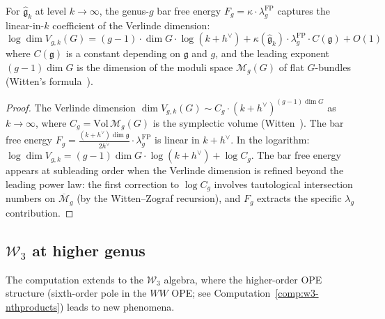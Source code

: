 \begin{proposition}
\label{prop:bar-verlinde-asymptotics}
For $\widehat{\mathfrak{g}}_k$ at level $k \to \infty$, the genus-$g$
bar free energy
$F_g = \kappa \cdot \lambda_g^{\mathrm{FP}}$
captures the linear-in-$k$ coefficient of the Verlinde dimension:
\begin{equation}\label{eq:bar-verlinde-leading}
\log \dim V_{g,k}(G) = (g-1) \cdot \dim G \cdot \log(k + h^\vee) + \kappa(\widehat{\mathfrak{g}}_k) \cdot \lambda_g^{\mathrm{FP}} \cdot C(\mathfrak{g}) + O(1)
\end{equation}
where $C(\mathfrak{g})$ is a constant depending on $\mathfrak{g}$ and
$g$, and the leading exponent $(g-1)\dim G$ is the dimension of the
moduli space $\mathcal{M}_g(G)$ of flat $G$-bundles
\textup{(}Witten's formula~\cite{Witten91}\textup{)}.
\end{proposition}

\begin{proof}
The Verlinde dimension $\dim V_{g,k}(G) \sim C_g \cdot (k + h^\vee)^{(g-1)\dim G}$ as $k \to \infty$, where $C_g = \mathrm{Vol}\,\mathcal{M}_g(G)$ is the symplectic volume (Witten~\cite{Witten91}).  The bar free energy $F_g = \frac{(k+h^\vee)\dim\mathfrak{g}}{2h^\vee} \cdot \lambda_g^{\mathrm{FP}}$ is linear in $k+h^\vee$.  In the logarithm: $\log \dim V_{g,k} = (g-1)\dim G \cdot \log(k+h^\vee) + \log C_g$.  The bar free energy appears at subleading order when the Verlinde dimension is refined beyond the leading power law: the first correction to $\log C_g$ involves tautological intersection numbers on $\overline{\mathcal{M}}_g$ (by the Witten--Zograf recursion), and $F_g$ extracts the specific $\lambda_g$ contribution.
\end{proof}

\subsection{\texorpdfstring{$\mathcal{W}_3$ at higher genus}{W3 at higher genus}}\label{subsec:w3-higher-genus}

The computation extends to the $\mathcal{W}_3$ algebra, where the higher-order OPE structure (sixth-order pole in the $WW$ OPE; see Computation~\ref{comp:w3-nthproducts}) leads to new phenomena.

